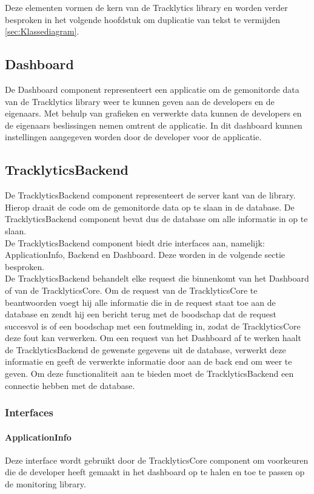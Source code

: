 Deze elementen vormen de kern van de Tracklytics library en worden verder besproken in het volgende hoofdstuk om duplicatie van tekst te vermijden \ref{sec:Klassediagram}. \\

\subsection{Dashboard}
De Dashboard component representeert een applicatie om de gemonitorde data van de Tracklytics library weer te kunnen geven aan de developers en de eigenaars. Met behulp van grafieken en verwerkte data kunnen de developers en de eigenaars beslissingen nemen omtrent de applicatie. In dit dashboard kunnen instellingen aangegeven worden door de developer voor de applicatie. \\

\subsection{TracklyticsBackend}
De TracklyticsBackend component representeert de server kant van de library. Hierop draait de code om de gemonitorde data op te slaan in de database. De TracklyticsBackend component bevat dus de database om alle informatie in op te slaan. \\
De TracklyticsBackend component biedt drie interfaces aan, namelijk: ApplicationInfo, Backend en Dashboard. Deze worden in de volgende sectie besproken.\\

De TracklyticsBackend behandelt elke request die binnenkomt van het Dashboard of van de TracklyticsCore. Om de request van de TracklyticsCore te beantwoorden voegt hij alle informatie die in de request staat toe aan de database en zendt hij een bericht terug met de boodschap dat de request succesvol is of een boodschap met een foutmelding in, zodat de TracklyticsCore deze fout kan verwerken. Om een request van het Dashboard af te werken haalt de TracklyticsBackend de gewenste gegevens uit de database, verwerkt deze informatie en geeft de verwerkte informatie door aan de back end om weer te geven. Om deze functionaliteit aan te bieden moet de TracklyticsBackend een connectie hebben met de database. 



\subsubsection{Interfaces}
\paragraph{ApplicationInfo}
Deze interface wordt gebruikt door de TracklyticsCore component om voorkeuren die de developer heeft gemaakt in het dashboard op te halen en toe te passen op de monitoring library.

